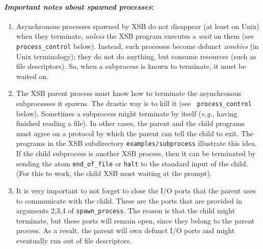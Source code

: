\paragraph{{\em Important notes about spawned processes\/}:}
\begin{enumerate}
\item Asynchronous processes spawned by XSB do not disappear (at least on
  Unix) when they terminate, \emph{unless} the XSB program executes a
  \emph{wait} on them (see {\tt process\_control} below). Instead, such
  processes become defunct \emph{zombies} (in Unix terminology); they do
  not do anything, but consume resources (such as file descriptors). So,
  when a subprocess is known to terminate, it must be waited on.
  
\item The XSB parent process must know how to terminate the asynchronous
  subprocesses it spawns. The drastic way is to kill it (see {\tt
    process\_control} below). Sometimes a subprocess might terminate by
  itself ({\it e.g.}, having finished reading a file). In other cases, the
  parent and the child programs must agree on a protocol by which the
  parent can tell the child to exit. The programs in the XSB subdirectory
  {\tt examples/subprocess} illustrate this idea. If the child subprocess
  is another XSB process, then it can be terminated by sending the atom
  {\tt end\_of\_file} or {\tt halt} to the standard input of the child.
  (For this to work, the child XSB must waiting at the prompt).
\item It is very important to not forget to close the I/O ports that the
  parent uses to communicate with the child. These are the ports that are
  provided in arguments 2,3,4 of {\tt spawn\_process}. The reason
  is that the child might terminate, but these ports will remain open,
  since they belong to the parent process. As a result, the parent will own
  defunct I/O ports and might eventually run out of file descriptors.
\end{enumerate}


